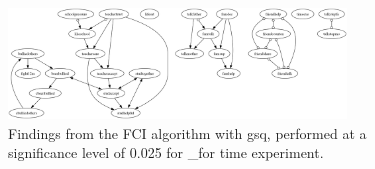 \begin{figure}[htbp]
    \centering
    \includegraphics[width=0.8\textwidth]{Report/final_report/pictures/FCI_gsq_0.025__for time experiment.png}
    \caption{Findings from the FCI algorithm with gsq, performed at a significance level of 0.025 for _for time experiment.}
    \label{fig:fci_gsq_0.025_for time experiment}
\end{figure}
